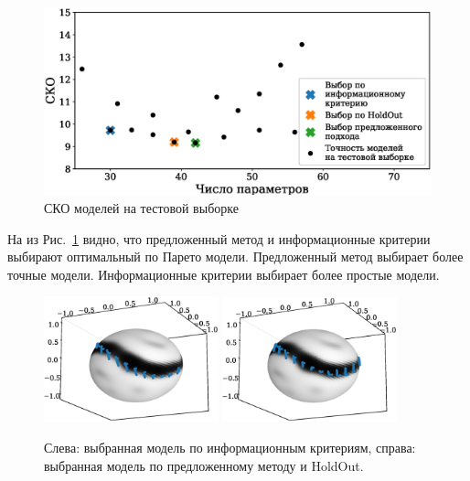 \documentclass[article,14pt,subf,href,colorlinks=true
]{disser}
\begin{document}
\begin{figure}[H]
    \centering
    \captionsetup{justification=centering,margin=2cm}
    \includegraphics[scale=0.6]{figs/pareto_fig.eps}
    \caption{СКО моделей на тестовой выборке}
    \label{fg:select_pareto}
\end{figure}

На  из Рис.~\ref{fg:select_pareto} видно, что предложенный метод и информационные критерии выбирают оптимальный по Парето модели.
Предложенный метод выбирает более точные модели.
Информационные критерии выбирает более простые модели.

\begin{figure}[h]
    \centering
    \captionsetup{justification=centering,margin=1cm}
    {\includegraphics[width=0.45\textwidth]{figs/IC_model.eps}}
    {\includegraphics[width=0.45\textwidth]{figs/P_model.eps}}\\
    \caption{Слева: выбранная модель по информационным критериям, справа: выбранная модель по предложенному методу и HoldOut.}
\label{fg:P_IC_model}
\end{figure}
\end{document}
